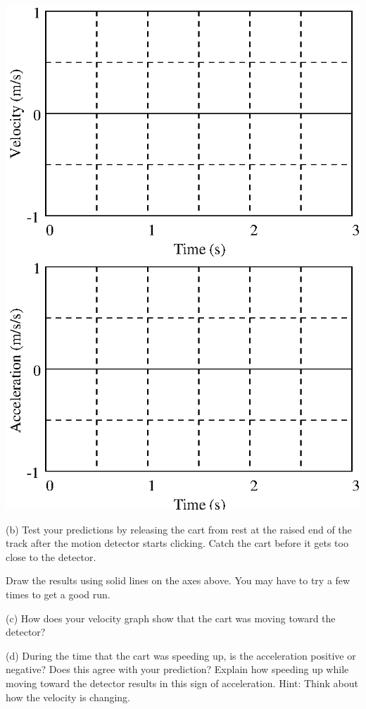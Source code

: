 \vspace{0.3cm}
{\par\centering \includegraphics{slowing/slowing_fig1.eps} \par}
\vspace{0.3cm}

(b) Test your predictions by releasing the cart from rest at the raised end of the track after the motion detector starts clicking. Catch the cart before it gets too close to the detector.

Draw the results using solid lines on the axes above. You may have to try a
few times to get a good run.

(c) How does your velocity graph show that the cart was moving toward the detector? 
\vspace{20mm}

(d) During the time that the cart was speeding up, is the acceleration positive
or negative? Does this agree with your prediction? Explain how speeding up while
moving toward the detector results in this sign of acceleration. Hint: Think
about how the velocity is changing.
\vspace{20mm}


